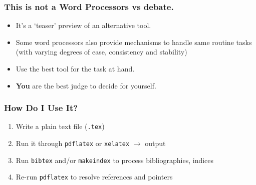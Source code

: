 
\begin{frame}
\frametitle{This is not a Word Processors vs  debate.}
\begin{itemize}
\item It's a `teaser' preview of an alternative tool.
\item Some word processors also provide mechanisms to handle same routine tasks (with varying degrees of ease, consistency and stability)
\item Use the best tool for the task at hand.
\item \textbf{\alert{You}} are the best judge to decide for yourself.
\end{itemize}
\end{frame}


\begin{frame}
\frametitle{How Do I Use It?}
\begin{enumerate}
\item<+-> Write a plain text  file (\texttt{.tex})
\item<+-> Run it through \texttt{pdflatex} or \texttt{xelatex} $\rightarrow$  output\\
\item<+-> Run \texttt{bibtex} and/or \texttt{makeindex} to process bibliographies, indices
\item<+-> Re-run \texttt{pdflatex} to resolve references and pointers
\end{enumerate}
\end{frame}

